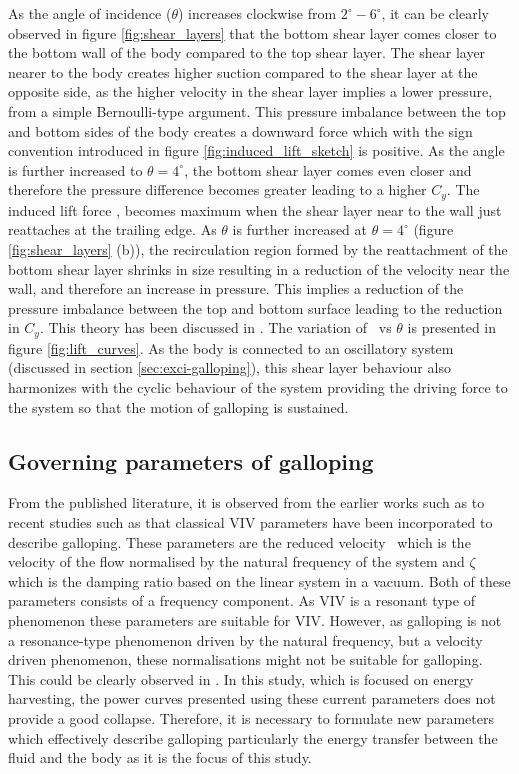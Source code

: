 As the angle of incidence ($\theta$) increases clockwise from $2^{\circ}-6^{\circ}$, it can be clearly observed in figure \ref{fig:shear_layers} that the bottom shear layer comes closer to the bottom wall of the body compared to the top shear layer. The shear layer nearer to the body creates higher suction compared to the shear layer at the opposite side, as the higher velocity in the shear layer implies a lower pressure, from a simple Bernoulli-type argument. This pressure imbalance between the top and bottom sides of the body creates a downward force which with the sign convention introduced in figure \ref{fig:induced_lift_sketch} is positive. As the angle is further increased to $\theta=4^{\circ}$, the bottom shear layer comes even closer and therefore the pressure difference becomes greater leading to a higher $C_{y}$. The induced lift force \cy, becomes maximum when the shear layer near to the wall just reattaches at the trailing edge. As $\theta$ is further increased at  $\theta=4^{\circ}$ (figure \ref{fig:shear_layers} (b)), the recirculation region formed by the reattachment of the bottom shear layer shrinks in size resulting in a reduction of the velocity near the wall, and therefore an increase in pressure. This implies a reduction of the pressure imbalance between the top and bottom surface leading to the reduction in $C_{y}$. This theory has been discussed in \citet{Parkinson1989}. The variation of \cy\ vs $\theta$ is presented in figure \ref{fig:lift_curves}. As the body is connected to an oscillatory system (discussed in section \ref{sec:exci-galloping}), this shear layer behaviour also harmonizes with the cyclic behaviour of the system providing the driving force to the system so that the motion of galloping is sustained.

\subsection{Governing parameters of galloping }

From the published literature, it is observed from the earlier works such as \citet{Parkinson1961,Luo1994} to recent studies such as \citet{Luo2003,Barrero-Gil2010a,Joly2012} that classical VIV parameters have been incorporated to describe galloping. These parameters are the reduced velocity \ustar\ which is the velocity of the flow normalised by the natural frequency of the system and $\zeta$ which is the damping ratio based on the linear system in a vacuum. Both of these parameters consists of a frequency component. As VIV is a resonant type of phenomenon these parameters are suitable for VIV. However, as galloping is not a resonance-type phenomenon driven by the natural frequency, but a velocity driven phenomenon, these normalisations might not be suitable for galloping. This could be clearly observed in \citet{Barrero-Gil2010a}. In this study, which is focused on energy harvesting, the power curves presented using these current parameters does not provide a good collapse. Therefore, it is necessary to formulate new parameters which effectively describe galloping particularly the energy transfer between the fluid and the body as it is the focus of this study.     


